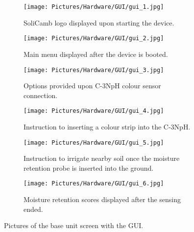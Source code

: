 \begin{figure}[h]
	\centering
	\begin{subfigure}[t]{0.3\linewidth} 
		\centering
		\texttt{[image: Pictures/Hardware/GUI/gui\_1.jpg]}
		\captionsetup{justification = centering}
		\caption{SoliCamb logo displayed upon starting the device. }
		\label{subfig:gui_1}
	\end{subfigure}
	\begin{subfigure}[t]{0.3\linewidth}
	\centering
	\texttt{[image: Pictures/Hardware/GUI/gui\_2.jpg]}
	\captionsetup{justification = centering}
		\caption{Main menu displayed after the device is booted.}
		\label{subfig:gui_2}
	\end{subfigure}
	\begin{subfigure}[t]{0.3\linewidth}
	\centering
		\texttt{[image: Pictures/Hardware/GUI/gui\_3.jpg]}
		\captionsetup{justification = centering}
		\caption{Options provided upon C-3NpH colour sensor connection.}
		\label{subfig:gui_3}
	\end{subfigure}
	
	\bigskip
\begin{subfigure}[t]{0.3\linewidth}
  \centering
  \texttt{[image: Pictures/Hardware/GUI/gui\_4.jpg]}
  \captionsetup{justification = centering}
  \caption{Instruction to inserting a colour strip into the C-3NpH.}
  \label{subfig:gui_4}
\end{subfigure}
\begin{subfigure}[t]{0.3\linewidth}
  \centering
  \texttt{[image: Pictures/Hardware/GUI/gui\_5.jpg]}
  \captionsetup{justification = centering}
  \caption{Instruction to irrigate nearby soil once the moisture retention probe is inserted into the ground.}\label{subfig:gui_5}
\end{subfigure}
\begin{subfigure}[t]{0.3\linewidth}
  \centering
  \texttt{[image: Pictures/Hardware/GUI/gui\_6.jpg]}
  \captionsetup{justification = centering}
  \caption{Moisture retention scores displayed after the sensing ended.}\label{subfig:gui_6}
\end{subfigure}

	\captionsetup{justification = centering}
	\captionsetup{justification = centering}
	\caption{Pictures of the base unit screen with the GUI.}
	\label{fig:gui_all}
\end{figure}   




